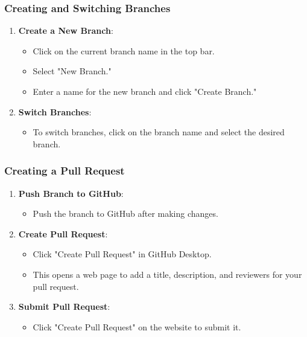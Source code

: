 \subsubsection{Creating and Switching Branches}

\begin{enumerate}
    \item \textbf{Create a New Branch}:
    \begin{itemize}
        \item Click on the current branch name in the top bar.
        \item Select "New Branch."
        \item Enter a name for the new branch and click "Create Branch."
    \end{itemize}

    \item \textbf{Switch Branches}:
    \begin{itemize}
        \item To switch branches, click on the branch name and select the desired branch.
    \end{itemize}
\end{enumerate}

\subsubsection{Creating a Pull Request}

\begin{enumerate}
    \item \textbf{Push Branch to GitHub}:
    \begin{itemize}
        \item Push the branch to GitHub after making changes.
    \end{itemize}

    \item \textbf{Create Pull Request}:
    \begin{itemize}
        \item Click "Create Pull Request" in GitHub Desktop.
        \item This opens a web page to add a title, description, and reviewers for your pull request.
    \end{itemize}

    \item \textbf{Submit Pull Request}:
    \begin{itemize}
        \item Click "Create Pull Request" on the website to submit it.
    \end{itemize}
\end{enumerate}

